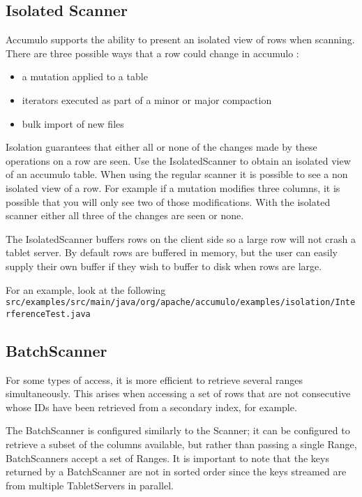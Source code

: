 \subsection{Isolated Scanner}

Accumulo supports the ability to present an isolated view of rows when
scanning.  There are three possible ways that a row could change in accumulo :

\begin{itemize}
 \item a mutation applied to a table
 \item iterators executed as part of a minor or major compaction
 \item bulk import of new files
\end{itemize}

Isolation guarantees that either all or none of the changes made by these
operations on a row are seen.  Use the IsolatedScanner to obtain an isolated
view of an accumulo table.  When using the regular scanner it is possible to see
a non isolated view of a row.  For example if a mutation modifies three
columns, it is possible that you will only see two of those modifications.
With the isolated scanner either all three of the changes are seen or none.

The IsolatedScanner buffers rows on the client side so a large row will not
crash a tablet server.  By default rows are buffered in memory, but the user
can easily supply their own buffer if they wish to buffer to disk when rows are
large.

For an example, look at the following\\ 
\texttt{src/examples/src/main/java/org/apache/accumulo/examples/isolation/InterferenceTest.java}

\subsection{BatchScanner}

For some types of access, it is more efficient to retrieve several ranges
simultaneously. This arises when accessing a set of rows that are not consecutive
whose IDs have been retrieved from a secondary index, for example.

The BatchScanner is configured similarly to the Scanner; it can be configured to
retrieve a subset of the columns available, but rather than passing a single Range,
BatchScanners accept a set of Ranges. It is important to note that the keys returned
by a BatchScanner are not in sorted order since the keys streamed are from multiple
TabletServers in parallel.

